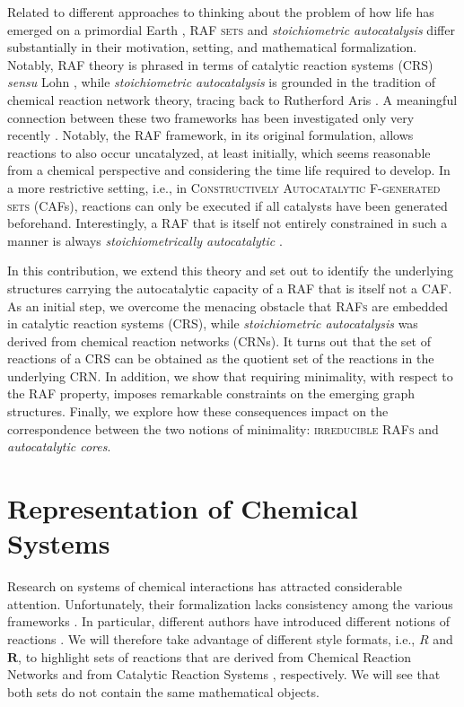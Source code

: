 \documentclass[pdflatex]{sn-jnl}
\theoremstyle{thmstyleone}%
\theoremstyle{examplesty}%
\theoremstyle{thmstylethree}%
\newcommand{\CR}[0]{R}
\newcommand{\FR}[0]{\mathbf{R}}
\newcommand{\PFS}[1]{\begingroup\color{cyan}#1\endgroup}
\begin{document}
Related to different approaches to thinking about the problem of how life
has emerged on a primordial Earth \cite{kauffman_autocatalytic_1986,
  unterberger_stoechiometric_2022}, \textsc{RAF sets} and
\emph{stoichiometric autocatalysis} differ substantially in their
motivation, setting, and mathematical formalization. \PFS{Notably,
  \textsc{RAF} theory is phrased in terms of catalytic reaction systems
  (CRS) \textit{sensu} Lohn \cite{lohn_evolving_1998}, while
  \emph{stoichiometric autocatalysis} is grounded in the tradition of
  chemical reaction network theory, tracing back to Rutherford Aris
  \cite{aris_prolegomena_1965}. A meaningful connection between these 
  two frameworks has been investigated} only very recently
\cite{golnik_bridging_2026}. Notably, the RAF framework, in its original
formulation, allows reactions to also occur uncatalyzed, at least
initially, which seems reasonable from a chemical perspective and
considering the time life required to develop. In a more restrictive
setting, i.e., in \textsc{Constructively Autocatalytic F-generated sets}
(CAFs), reactions can only be executed if all catalysts have been generated
beforehand. Interestingly, a RAF that is itself not entirely constrained in
such a manner is always \emph{stoichiometrically autocatalytic}
\cite{golnik_bridging_2026}.

In this contribution, we extend this theory and set out to identify the
underlying structures carrying the autocatalytic capacity of a RAF that is
itself not a CAF. As an initial step, we overcome the menacing obstacle
that \textsc{RAFs} are embedded in catalytic reaction systems (CRS), while
\emph{stoichiometric autocatalysis} was derived from chemical reaction
networks (CRNs). It turns out that the set of reactions of a CRS can be
obtained as the quotient set of the reactions in the underlying CRN. In
addition, we show that requiring minimality, with respect to the RAF
property, imposes remarkable constraints on the emerging graph
structures. Finally, we explore how these consequences impact on the
correspondence between the two notions of minimality: \textsc{irreducible
  RAFs} and \emph{autocatalytic cores}.

\section{Representation of Chemical Systems}

Research on systems of chemical interactions has attracted
considerable attention. Unfortunately, their formalization lacks
consistency among the various frameworks \cite{lohn_evolving_1998,
  steel_emergence_2000, feinberg_foundations_2019}. In particular,
different authors have introduced different notions of reactions
\cite{muller_what_2022}. We will therefore take advantage of different
style formats, i.e., $\CR$ and $\FR$, to highlight sets of reactions that
are derived from Chemical Reaction Networks \cite{muller_what_2022} and
from Catalytic Reaction Systems \cite{lohn_evolving_1998}, respectively. We
will see that both sets do not contain the same mathematical objects.
\end{document}
